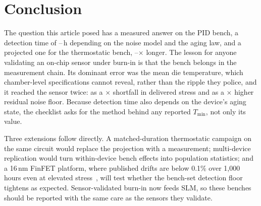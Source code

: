 \documentclass[10pt,twocolumn]{article}
\newcommand{\Tmin}{T_{\min}}
\begin{document}
\section{Conclusion}

The question this article posed has a measured answer on the PID bench, a detection time of \vTminSeq--\vTminLrv\,h depending on the noise model and the aging law, and a projected one for the thermostatic bench, \vPenLow--\vPenHigh$\times$ longer. The lesson for anyone validating an on-chip sensor under burn-in is that the bench belongs in the measurement chain. Its dominant error was the mean die temperature, which chamber-level specifications cannot reveal, rather than the ripple they police, and it reached the sensor twice: as a \vAFratio$\times$ shortfall in delivered stress and as a \vSigRawRatio$\times$ higher residual noise floor. Because detection time also depends on the device's aging state, the checklist asks for the method behind any reported $\Tmin$, not only its value.

Three extensions follow directly. A matched-duration thermostatic campaign on the same circuit would replace the projection with a measurement; multi-device replication would turn within-device bench effects into population statistics; and a 16\,nm FinFET platform, where published drifts are below 0.1\% over 1,000 hours even at elevated stress~\cite{sobas}, will test whether the bench-set detection floor tightens as expected. Sensor-validated burn-in now feeds SLM, so these benches should be reported with the same care as the sensors they validate.
\end{document}
